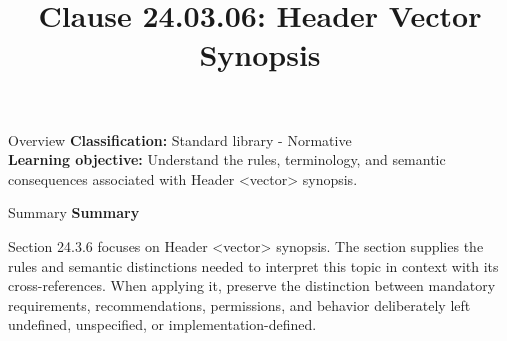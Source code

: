 \documentclass[10pt,letterpaper]{article}
\title{Clause 24.03.06: Header Vector Synopsis}
\author{}
\date{}
\begin{document}
\maketitle
\begin{CornellOverviewBox}{Overview}
\textbf{Classification:} Standard library - Normative\\[2pt]
\textbf{Learning objective:} Understand the rules, terminology, and semantic consequences associated with Header <vector> synopsis.
\end{CornellOverviewBox}\begin{CornellSummaryBox}{Summary}
{\sffamily\bfseries\color{Accent} Summary}\par\vspace{3pt}Section 24.3.6 focuses on Header <vector> synopsis. The section supplies the rules and semantic distinctions needed to interpret this topic in context with its cross-references. When applying it, preserve the distinction between mandatory requirements, recommendations, permissions, and behavior deliberately left undefined, unspecified, or implementation-defined.
\end{CornellSummaryBox}
\end{document}
